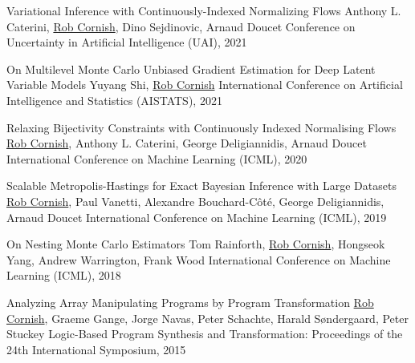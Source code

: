 \documentclass[9pt]{developercv} %
\begin{document}
\begin{entrylist}
    \publication
        {Variational Inference with Continuously-Indexed Normalizing Flows}
        {Anthony L. Caterini, \underline{Rob Cornish}, Dino Sejdinovic, Arnaud Doucet}
        {Conference on Uncertainty in Artificial Intelligence (UAI), 2021}

    \publication
        {On Multilevel Monte Carlo Unbiased Gradient Estimation for Deep Latent Variable Models}
        {Yuyang Shi, \underline{Rob Cornish}}
        {International Conference on Artificial Intelligence and Statistics (AISTATS), 2021}

    \publication
        {Relaxing Bijectivity Constraints with Continuously Indexed Normalising Flows}
        {\underline{Rob Cornish}, Anthony L. Caterini, George Deligiannidis, Arnaud Doucet}
        {International Conference on Machine Learning (ICML), 2020}

    \publication
        {Scalable Metropolis-Hastings for Exact Bayesian Inference with Large Datasets}
        {\underline{Rob Cornish}, Paul Vanetti, Alexandre Bouchard-C\^ot\'e, George Deligiannidis, Arnaud Doucet}
        {International Conference on Machine Learning (ICML), 2019}


    \publication
        {On Nesting Monte Carlo Estimators}
        {Tom Rainforth, \underline{Rob Cornish}, Hongseok Yang, Andrew Warrington, Frank Wood}
        {International Conference on Machine Learning (ICML), 2018}

    \publication
        {Analyzing Array Manipulating Programs by Program Transformation}
        {\underline{Rob Cornish}, Graeme Gange, Jorge Navas, Peter Schachte, Harald S\o ndergaard, Peter Stuckey}
        {Logic-Based Program Synthesis and Transformation: Proceedings of the 24th International Symposium, 2015}
\end{entrylist}

\end{document}
